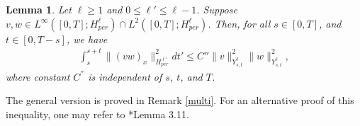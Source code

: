 \documentclass[10pt,a4paper,final]{article}
\numberwithin{equation}{section}
\newtheorem{lemma}[theorem]{Lemma}
\newcommand{\bT}{\mathbb{T}}
\begin{document}

\begin{lemma} \label{bilinear}
    Let $\ell\geq 1$ and $0\leq \ell'\leq \ell-1$. Suppose $v,w\in L^{\infty}([0,T]; H^\ell_{per})\cap L^2([0,T]; H^\ell_{per})$. Then, for all $s\in [0,T]$, and $t\in [0,T-s]$, we have 
     \begin{align*}
        \int_s^{s+t}\|(vw)_x\|_{H^{\ell'}_{per}}^2dt'\leq C'' \|v\|_{Y^{\ell}_{s,t}}^2\|w\|_{Y^{\ell}_{s,t}}^2,
    \end{align*}
    where constant $C^{''}$ is independent of $s$, $t$, and $T$.
\end{lemma}
The general version is proved in Remark \ref{multi}. For an alternative proof of this inequality, one may refer to \cite{LW}*{Lemma 3.11}.






\end{document}

